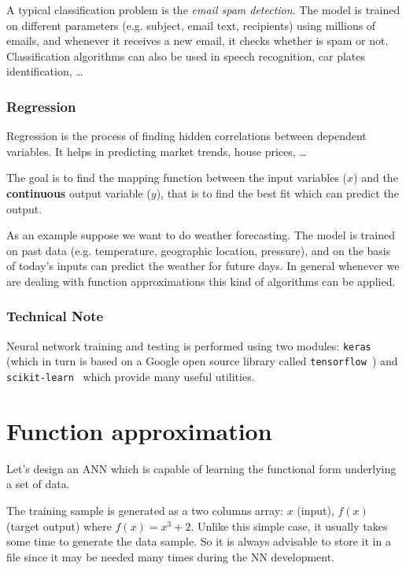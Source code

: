A typical classification problem is the \emph{email spam detection}. The model is trained on different parameters (e.g. subject, email text, recipients) using millions of emails, and whenever it receives a new email, it checks whether is spam or not. Classification algorithms can also be used in speech recognition, car plates identification, \ldots

\subsubsection{Regression}
\label{regression}

Regression is the process of finding hidden correlations between dependent variables. It helps in predicting market trends, house prices, \ldots

The goal is to find the mapping function between the input variables (\(x\)) and the \textbf{continuous} output variable (\(y\)), that is to find the best fit which can predict the output.

As an example suppose we want to do weather forecasting. The model is trained on past data (e.g. temperature, geographic location, pressure), and on the basis of today's inputs can predict the weather for future days. In general whenever we are dealing with function approximations this kind of algorithms can be applied.

\begin{attention}
\subsubsection{Technical Note}
\label{technical-note}

Neural network training and testing is performed using two modules: \texttt{keras}~\cite{bib:keras} (which in turn is based on a Google open source library called \texttt{tensorflow}~\cite{bib:tensorflow}) and \texttt{scikit-learn}~\cite{bib:scikit} which provide many useful utilities.
\end{attention}

\section{Function approximation}
\label{function-approximation}

Let's design an ANN which is capable of learning the functional form underlying a set of data. 

The training sample is generated as a two columns array: \(x\) (input), \(f(x)\) (target output) where \(f(x) = x^3 +2\). 
Unlike this simple case, it usually takes some time to generate the data sample. So it is always advisable to store it in a file since it may be needed many times during the NN development. 


